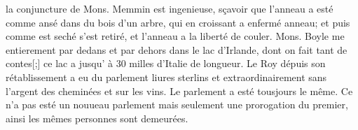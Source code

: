 la conjuncture de Mons. \label{LH041,02_009r_Memmin}Memmin\protect{}
est ingenieuse, s\c{c}avoir que l'anneau a est\'{e} comme ans\'{e} dans du bois d'un arbre, qui en croissant a enferm\'{e} anneau; et puis comme est sech\'{e} s'est retir\'{e}, et l'anneau a la libert\'{e} de couler.
\pend%
\pstart%
Mons. Boyle\protect{} me
entierement par dedans et par dehors dans le lac d'Irlande\protect{}, dont on fait tant de contes[;] ce lac a jusqu' \`{a} 30 milles d'Italie de longueur.
\pend%
\pstart%
Le Roy\protect{} d\'{e}puis son r\'{e}tablissement a eu du parlement
liures sterlins et extraordinairement  sans l'argent des chemin\'{e}es et sur les vins.
\pend%
\pstart%
Le parlement a est\'{e} tousjours le m\^{e}me. Ce
n'a pas est\'{e} un nouueau parlement mais seulement une prorogation du premier, ainsi les m\^{e}mes personnes sont demeur\'{e}es.
\pend%
\count{}
\count{}
\count{}
